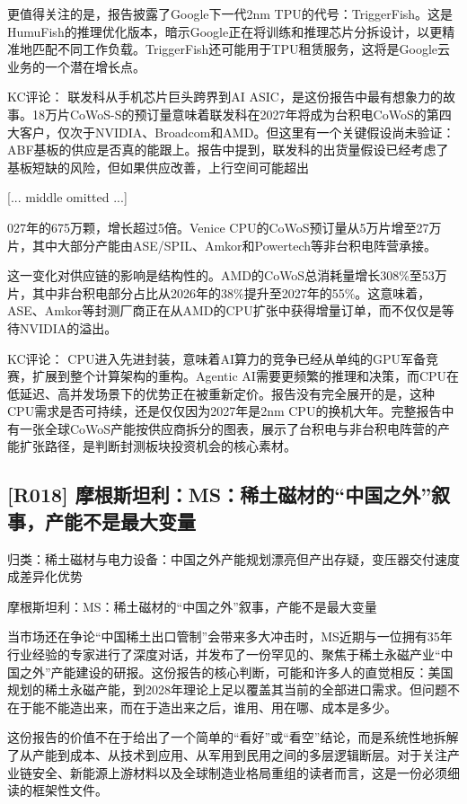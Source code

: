 \documentclass[11pt]{ctexart}
\begin{document}
更值得关注的是，报告披露了Google下一代2nm TPU的代号：TriggerFish。这是HumuFish的推理优化版本，暗示Google正在将训练和推理芯片分拆设计，以更精准地匹配不同工作负载。TriggerFish还可能用于TPU租赁服务，这将是Google云业务的一个潜在增长点。

KC评论： 联发科从手机芯片巨头跨界到AI ASIC，是这份报告中最有想象力的故事。18万片CoWoS-S的预订量意味着联发科在2027年将成为台积电CoWoS的第四大客户，仅次于NVIDIA、Broadcom和AMD。但这里有一个关键假设尚未验证：ABF基板的供应是否真的能跟上。报告中提到，联发科的出货量假设已经考虑了基板短缺的风险，但如果供应改善，上行空间可能超出

[... middle omitted ...]

027年的675万颗，增长超过5倍。Venice CPU的CoWoS预订量从5万片增至27万片，其中大部分产能由ASE/SPIL、Amkor和Powertech等非台积电阵营承接。

这一变化对供应链的影响是结构性的。AMD的CoWoS总消耗量增长308\%至53万片，其中非台积电部分占比从2026年的38\%提升至2027年的55\%。这意味着，ASE、Amkor等封测厂商正在从AMD的CPU扩张中获得增量订单，而不仅仅是等待NVIDIA的溢出。

KC评论： CPU进入先进封装，意味着AI算力的竞争已经从单纯的GPU军备竞赛，扩展到整个计算架构的重构。Agentic AI需要更频繁的推理和决策，而CPU在低延迟、高并发场景下的优势正在被重新定价。报告没有完全展开的是，这种CPU需求是否可持续，还是仅仅因为2027年是2nm CPU的换机大年。完整报告中有一张全球CoWoS产能按供应商拆分的图表，展示了台积电与非台积电阵营的产能扩张路径，是判断封测板块投资机会的核心素材。

\subsection{[R018] 摩根斯坦利：MS：稀土磁材的“中国之外”叙事，产能不是最大变量}
{\small\color{refgray}归类：稀土磁材与电力设备：中国之外产能规划漂亮但产出存疑，变压器交付速度成差异化优势}

摩根斯坦利：MS：稀土磁材的“中国之外”叙事，产能不是最大变量

当市场还在争论“中国稀土出口管制”会带来多大冲击时，MS近期与一位拥有35年行业经验的专家进行了深度对话，并发布了一份罕见的、聚焦于稀土永磁产业“中国之外”产能建设的研报。这份报告的核心判断，可能和许多人的直觉相反：美国规划的稀土永磁产能，到2028年理论上足以覆盖其当前的全部进口需求。但问题不在于能不能造出来，而在于造出来之后，谁用、用在哪、成本是多少。

这份报告的价值不在于给出了一个简单的“看好”或“看空”结论，而是系统性地拆解了从产能到成本、从技术到应用、从军用到民用之间的多层逻辑断层。对于关注产业链安全、新能源上游材料以及全球制造业格局重组的读者而言，这是一份必须细读的框架性文件。
\end{document}
